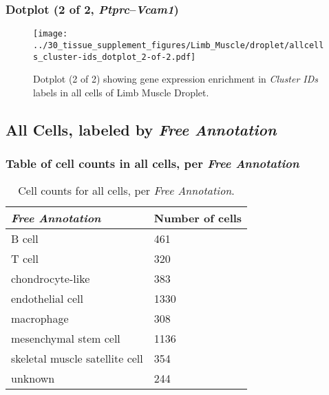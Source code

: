 \clearpage

\subsubsection{Dotplot (2 of 2, \emph{Ptprc}--\emph{Vcam1})}
\begin{figure}[h]
\centering
\texttt{[image: ../30\_tissue\_supplement\_figures/Limb\_Muscle/droplet/allcells\_cluster-ids\_dotplot\_2-of-2.pdf]}

\caption{ Dotplot (2 of 2)  showing gene expression enrichment in \emph{Cluster IDs} labels in all cells of Limb Muscle Droplet. }
\end{figure}


\clearpage

\subsection{All Cells, labeled by \emph{Free Annotation}}
\subsubsection{Table of cell counts in all cells, per \emph{Free Annotation}}\begin{table}[h]
\centering
\label{my-label}
\begin{tabular}{@{}ll@{}}
\toprule

\emph{Free Annotation}& Number of cells \\ \midrule
B cell & 461 \\

T cell & 320 \\

chondrocyte-like & 383 \\

endothelial cell & 1330 \\

macrophage & 308 \\

mesenchymal stem cell & 1136 \\

skeletal muscle satellite cell & 354 \\

unknown & 244 \\
\bottomrule
\end{tabular}
\caption{Cell counts for all cells, per \emph{Free Annotation}.}
\end{table}

\clearpage
